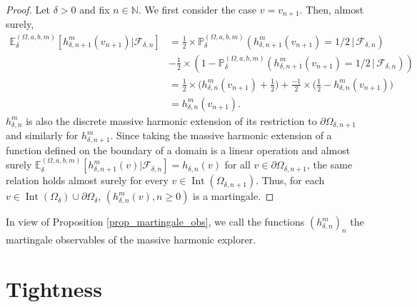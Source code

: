 \documentclass{article}
\newcommand{\PP}{{\mathbb{P}}}
\newcommand{\EE}{{\mathbb{E}}}
\theoremstyle{definition}
\theoremstyle{remark}
\theoremstyle{remark}
\begin{document}
\begin{proof}
    Let $\delta >0$ and fix $n \in \mathbb{N}$. We first consider the case $v=v_{n+1}$. Then, almost surely,
    \begin{align*}
        \EE_{\delta}^{(\Omega,a,b,m)}[h_{\delta, n+1}^m(v_{n+1}) \vert \mathcal{F}_{\delta, n}] &= \frac{1}{2}\times \PP_{\delta}^{(\Omega,a,b,m)}(h_{\delta, n+1}^m(v_{n+1})=1/2 \, \vert \, \mathcal{F}_{\delta, n}) \\
        &- \frac{1}{2} \times (1-\PP_{\delta}^{(\Omega,a,b,m)}(h_{\delta, n+1}^m(v_{n+1})=1/2 \, \vert \, \mathcal{F}_{\delta, n})) \\
        &= \frac{1}{2} \times \bigg(h_{\delta, n}^m(v_{n+1}) + \frac{1}{2} \bigg) + \frac{-1}{2} \times \bigg( \frac{1}{2} -h_{\delta, n}^m(v_{n+1}) \bigg) \\
        &= h_{\delta, n}^m(v_{n+1}).
    \end{align*}
    $h_{\delta, n}^m$ is also the discrete massive harmonic extension of its restriction to $\partial \Omega_{\delta, n+1}$ and similarly for $h_{\delta, n+1}^{m}$. Since taking the massive harmonic extension of a function defined on the boundary of a domain is a linear operation and almost surely $\EE_{\delta}^{(\Omega,a,b,m)}[h_{\delta, n+1}^m(v) \vert \mathcal{F}_{\delta, n}] = h_{\delta, n}(v)$ for all $v \in \partial \Omega_{\delta, n+1}$, the same relation holds almost surely for every $v \in \operatorname{Int}(\Omega_{\delta, n+1})$. Thus, for each $v \in \operatorname{Int}(\Omega_{\delta}) \cup \partial \Omega_{\delta}$, $(h_{\delta,n}^m(v), n \geq 0)$ is a martingale.
\end{proof}

In view of Proposition \ref{prop_martingale_obs}, we call the functions $(h_{\delta,n}^m)_n$ the martingale observables of the massive harmonic explorer.

\section{Tightness} \label{sec_tightness}
\end{document}
